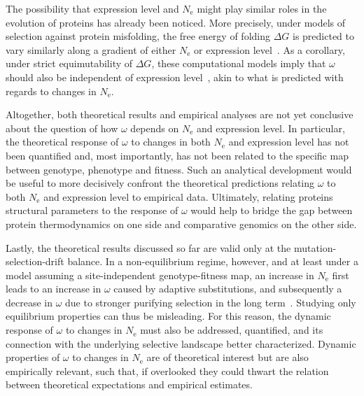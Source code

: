 \documentclass[authoryear]{elsarticle} %
\newcommand{\Ne}{N_{\text{e}}} %
\newcommand{\G}{G} %
\newcommand{\DeltaG}{\Delta \G} %
\begin{document}
The possibility that expression level and $\Ne$ might play similar roles in the evolution of proteins has already been noticed.
More precisely, under models of selection against protein misfolding, the free energy of folding $\DeltaG$ is predicted to vary similarly along a gradient of either $\Ne$ or expression level~\citep{Serohijos2013}.
As a corollary, under strict equimutability of $\DeltaG$, these computational models imply that $\omega$ should also be independent of expression level~\citep{Serohijos2012}, akin to what is predicted with regards to changes in $\Ne$.

Altogether, both theoretical results and empirical analyses are not yet conclusive about the question of how $\omega$ depends on $\Ne$ and expression level.
In particular, the theoretical response of $\omega$ to changes in both $\Ne$ and expression level has not been quantified and, most importantly, has not been related to the specific map between genotype, {phenotype} and fitness.
Such an analytical development would be useful to more decisively confront the theoretical predictions relating $\omega$ to both $\Ne$ and expression level to empirical data.
Ultimately, relating proteins structural parameters to the response of $\omega$ would help to bridge the gap between protein thermodynamics on one side and comparative genomics on the other side.

Lastly, the theoretical results discussed so far are valid only at the mutation-selection-drift balance.
In a non-equilibrium regime, however, and at least under a model assuming a site-independent genotype-fitness map, an increase in $\Ne$ first leads to an increase in $\omega$ caused by adaptive {substitutions}, and subsequently a decrease in $\omega$ due to stronger purifying selection in the long term~\citep{Jones2016}.
Studying only equilibrium properties can thus be misleading.
For this reason, the dynamic response of $\omega$ to changes in $\Ne$ must also be addressed, quantified, and its connection with the underlying selective landscape better characterized.
Dynamic properties of $\omega$ to changes in $\Ne$ are of theoretical interest but are also empirically relevant, such that, if overlooked they could thwart the relation between theoretical expectations and empirical estimates.
\end{document}
